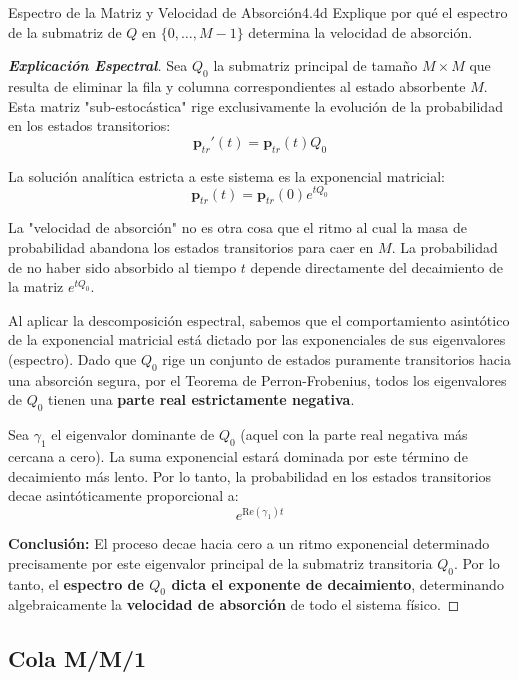 \documentclass[10pt,a4paper]{article}
\begin{document}
\newpage
\begin{ejercicio}{Espectro de la Matriz y Velocidad de Absorción}{4.4d}
    Explique por qué el espectro de la submatriz de $Q$ en $\{0, \dots, M-1\}$ determina la velocidad de absorción.
\end{ejercicio}

\begin{proof}[\textbf{Explicación Espectral}]
    Sea $Q_0$ la submatriz principal de tamaño $M \times M$ que resulta de eliminar la fila y columna correspondientes al estado absorbente $M$. Esta matriz "sub-estocástica" rige exclusivamente la evolución de la probabilidad en los estados transitorios:
    \[ \mathbf{p}_{tr}'(t) = \mathbf{p}_{tr}(t)Q_0 \]
    
    La solución analítica estricta a este sistema es la exponencial matricial:
    \[ \mathbf{p}_{tr}(t) = \mathbf{p}_{tr}(0) e^{t Q_0} \]
    
    La "velocidad de absorción" no es otra cosa que el ritmo al cual la masa de probabilidad abandona los estados transitorios para caer en $M$. La probabilidad de no haber sido absorbido al tiempo $t$ depende directamente del decaimiento de la matriz $e^{t Q_0}$.
    
    Al aplicar la descomposición espectral, sabemos que el comportamiento asintótico de la exponencial matricial está dictado por las exponenciales de sus eigenvalores (espectro). Dado que $Q_0$ rige un conjunto de estados puramente transitorios hacia una absorción segura, por el Teorema de Perron-Frobenius, todos los eigenvalores de $Q_0$ tienen una \textbf{parte real estrictamente negativa}.
    
    Sea $\gamma_1$ el eigenvalor dominante de $Q_0$ (aquel con la parte real negativa más cercana a cero). La suma exponencial estará dominada por este término de decaimiento más lento. Por lo tanto, la probabilidad en los estados transitorios decae asintóticamente proporcional a:
    \[ e^{\text{Re}(\gamma_1) t} \]
    
    \textbf{Conclusión:}
    El proceso decae hacia cero a un ritmo exponencial determinado precisamente por este eigenvalor principal de la submatriz transitoria $Q_0$. Por lo tanto, el \textbf{espectro de $Q_0$ dicta el exponente de decaimiento}, determinando algebraicamente la \textbf{velocidad de absorción} de todo el sistema físico.
\end{proof}

\newpage
\subsection{Cola M/M/1}
\end{document}

